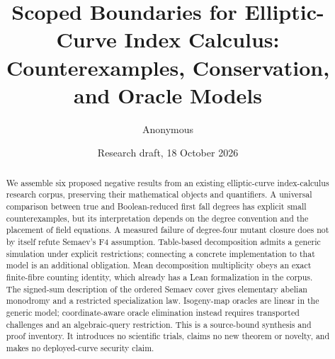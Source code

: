 \documentclass[11pt]{article}
\title{Scoped Boundaries for Elliptic-Curve Index Calculus:\\Counterexamples, Conservation, and Oracle Models}
\author{Anonymous}
\date{Research draft, 18 October 2026}
\begin{document}
\maketitle
\begin{abstract}
We assemble six proposed negative results from an existing elliptic-curve
index-calculus research corpus, preserving their mathematical objects and
quantifiers. A universal comparison between true and Boolean-reduced first
fall degrees has explicit small counterexamples, but its interpretation depends
on the degree convention and the placement of field equations. A measured
failure of degree-four mutant closure does not by itself refute Semaev's F4
assumption. Table-based decomposition admits a generic simulation under
explicit restrictions; connecting a concrete implementation to that model is
an additional obligation. Mean decomposition multiplicity obeys an exact
finite-fibre counting identity, which already has a Lean formalization in the
corpus. The signed-sum description of the ordered Semaev cover gives elementary
abelian monodromy and a restricted specialization law. Isogeny-map oracles are
linear in the generic model; coordinate-aware oracle elimination instead
requires transported challenges and an algebraic-query restriction. This is a
source-bound synthesis and proof inventory. It introduces no scientific trials,
claims no new theorem or novelty, and makes no deployed-curve security claim.
\end{abstract}
\tableofcontents










\end{document}

